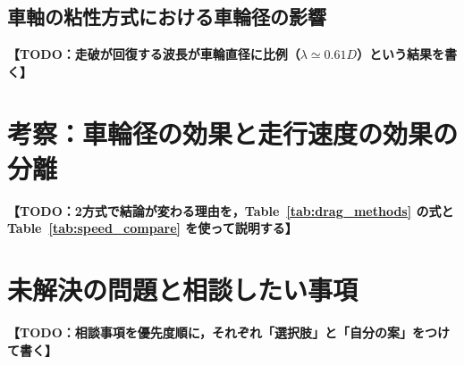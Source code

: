 \documentclass[uplatex,dvipdfmx]{jsarticle}
\newcommand{\todo}[1]{\textbf{【TODO：#1】}}
\begin{document}
\subsection{車軸の粘性方式における車輪径の影響}
\todo{走破が回復する波長が車輪直径に比例（$\lambda \simeq 0.61D$）という結果を書く}

\begin{table}[t!]
    \caption{Steady speed on flat ground for the two methods}
    \label{tab:speed_compare}
    \centering
\end{table}

\section{考察：車輪径の効果と走行速度の効果の分離}
\todo{2方式で結論が変わる理由を，Table~\ref{tab:drag_methods} の式と Table~\ref{tab:speed_compare} を使って説明する}

\section{未解決の問題と相談したい事項}
\todo{相談事項を優先度順に，それぞれ「選択肢」と「自分の案」をつけて書く}
\end{document}
